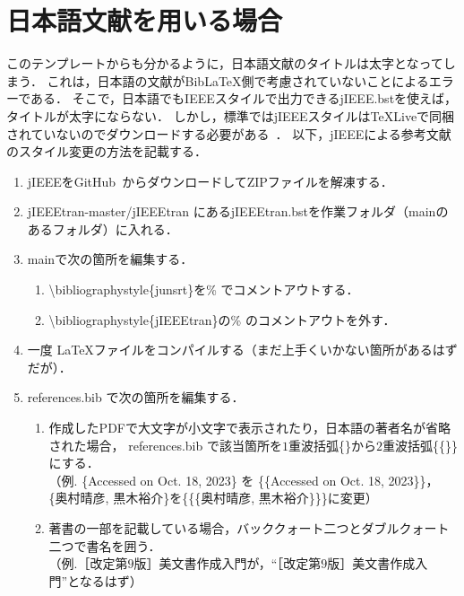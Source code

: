 \chapter{日本語文献を用いる場合}
このテンプレートからも分かるように，日本語文献のタイトルは太字となってしまう．
これは，日本語の文献がBib{\LaTeX}側で考慮されていないことによるエラーである．
そこで，日本語でもIEEEスタイルで出力できるjIEEE.bstを使えば，タイトルが太字にならない．
しかし，標準ではjIEEEスタイルは\TeX Liveで同梱されていないのでダウンロードする必要がある~\cite{jieeetran}．
以下，jIEEEによる参考文献のスタイル変更の方法を記載する．

\begin{enumerate}
    \item jIEEEをGitHub~\cite{jieeetran}からダウンロードしてZIPファイルを解凍する．
    \item jIEEEtran-master/jIEEEtran にあるjIEEEtran.bstを作業フォルダ（mainのあるフォルダ）に入れる．
    \item mainで次の箇所を編集する．
        \begin{enumerate}
            \item \textbackslash bibliographystyle\{junsrt\}を\% でコメントアウトする．
            \item \textbackslash bibliographystyle\{jIEEEtran\}の\% のコメントアウトを外す．
        \end{enumerate}
    \item 一度 \LaTeX ファイルをコンパイルする（まだ上手くいかない箇所があるはずだが）．
    \item references.bib で次の箇所を編集する．
        \begin{enumerate}
            \item 作成したPDFで大文字が小文字で表示されたり，日本語の著者名が省略された場合，
                references.bib で該当箇所を$1$重波括弧\{\}から$2$重波括弧\{\{\}\}にする．\\
                （例. \{Accessed on Oct. 18, 2023\} を \{\{Accessed on Oct. 18, 2023\}\}，\\
                    \{奥村晴彦, 黒木裕介\}を\{\{\{奥村晴彦, 黒木裕介\}\}\}に変更）
            \item 著書の一部を記載している場合，バッククォート二つとダブルクォート二つで書名を囲う．\\
                （例.［改定第$9$版］\LaTeXe 美文書作成入門が，``［改定第$9$版］\LaTeXe 美文書作成入門''となるはず）
        \end{enumerate}
\end{enumerate}